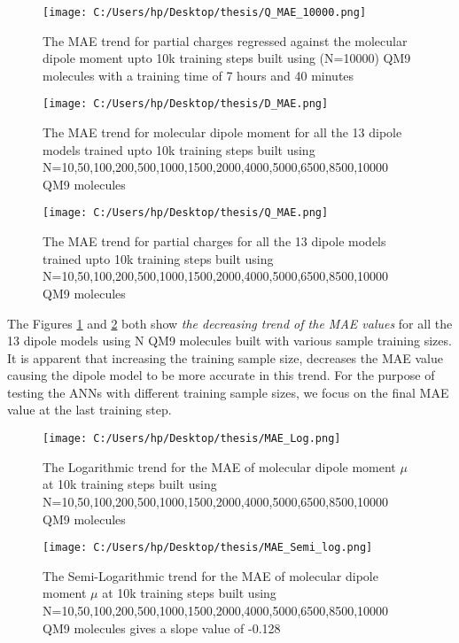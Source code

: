 \documentclass[11pt,a4paper]{report}
\begin{document}
{\begin{figure} [H]
\centering
\texttt{[image: C:/Users/hp/Desktop/thesis/Q\_MAE\_10000.png]}
\caption{The MAE trend for partial charges regressed against the molecular dipole moment upto 10k training steps built using (N=10000) QM9 molecules with a training time of 7 hours and 40 minutes}
\end{figure}

\begin{figure} 
\centering
\texttt{[image: C:/Users/hp/Desktop/thesis/D\_MAE.png]}
\caption{The MAE trend for molecular dipole moment for all the 13 dipole models trained upto 10k training steps built using N=10,50,100,200,500,1000,1500,2000,4000,5000,6500,8500,10000 QM9 molecules}
\label{D_MAE}
\end{figure}

\begin{figure} [H]
\centering
\texttt{[image: C:/Users/hp/Desktop/thesis/Q\_MAE.png]}
\caption{The MAE trend for partial charges for all the 13 dipole models trained upto 10k training steps built using \linebreak
N=10,50,100,200,500,1000,1500,2000,4000,5000,6500,8500,10000 QM9 molecules}
\label{Q_MAE}
\end{figure}
The Figures \ref{D_MAE} and \ref{Q_MAE} both show \emph{the decreasing trend of the MAE values} for all the 13 dipole models using N QM9 molecules built with various sample training sizes. It is apparent that increasing the training sample size, decreases the MAE value causing the dipole model to be more accurate in this trend. For the purpose of testing the ANNs with different training sample sizes, we focus on the final MAE value at the last training step.

\begin{figure} [H]
\centering
\texttt{[image: C:/Users/hp/Desktop/thesis/MAE\_Log.png]}
\caption{The Logarithmic trend for the MAE of molecular dipole moment $\mu$ at 10k training steps built using \linebreak
N=10,50,100,200,500,1000,1500,2000,4000,5000,6500,8500,10000 QM9 molecules}
\end{figure}
\begin{figure} [H]
\centering
\texttt{[image: C:/Users/hp/Desktop/thesis/MAE\_Semi\_log.png]}
\caption{The Semi-Logarithmic trend for the MAE of molecular dipole moment $\mu$ at 10k training steps built using \linebreak
N=10,50,100,200,500,1000,1500,2000,4000,5000,6500,8500,10000 QM9 molecules gives a slope value of -0.128}
\end{figure}


}
\end{document}
